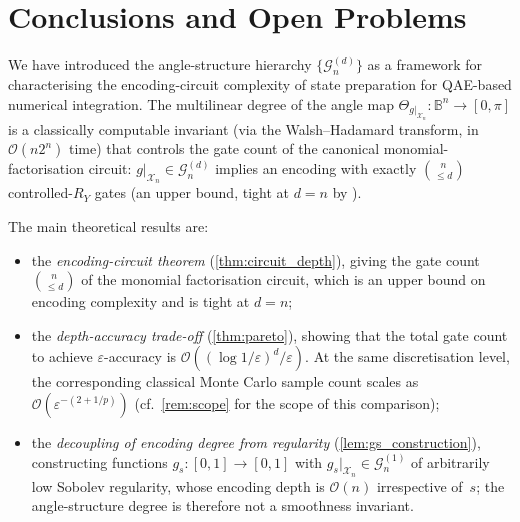 \documentclass[12pt,a4paper]{article}
\theoremstyle{plain}
\theoremstyle{definition}
\theoremstyle{remark}
\newcommand{\Ry}{R_Y}
\newcommand{\Gclass}[2]{\mathcal{G}_{#1}^{(#2)}}
\begin{document}
\section{Conclusions and Open Problems}
\label{sec:conclusions}

We have introduced the angle-structure hierarchy $\{\Gclass{n}{d}\}$ as
a framework for characterising the encoding-circuit complexity of state
preparation for QAE-based numerical integration.
The multilinear degree of the angle map $\Theta_{g|_{\mathcal{X}_n}}:\mathbb{B}^n\to[0,\pi]$
is a classically computable invariant (via the Walsh--Hadamard transform,
in $\mathcal{O}(n2^n)$ time) that controls the gate count of the
canonical monomial-factorisation circuit: $g|_{\mathcal{X}_n}\in\Gclass{n}{d}$
implies an encoding with exactly $\binom{n}{\leq d}$ controlled-$\Ry$
gates (an upper bound, tight at $d=n$ by \cite{ShendeBullockMarkov2006}).

The main theoretical results are:
\begin{itemize}
  \item the \emph{encoding-circuit theorem} (\cref{thm:circuit_depth}),
        giving the gate count $\binom{n}{\leq d}$ of the monomial
        factorisation circuit, which is an upper bound on encoding
        complexity and is tight at $d=n$;
  \item the \emph{depth-accuracy trade-off} (\cref{thm:pareto}),
        showing that the total gate count to achieve $\varepsilon$-accuracy
        is $\mathcal{O}((\log1/\varepsilon)^d/\varepsilon)$.  At the
        same discretisation level, the corresponding classical Monte
        Carlo sample count scales as
        $\mathcal{O}(\varepsilon^{-(2+1/p)})$
        (cf.\ \cref{rem:scope} for the scope of this comparison);
  \item the \emph{decoupling of encoding degree from regularity}
        (\cref{lem:gs_construction}), constructing functions
        $g_s:[0,1]\to[0,1]$ with
        $g_s|_{\mathcal{X}_n}\in\Gclass{n}{1}$ of arbitrarily low
        Sobolev regularity, whose encoding depth is $\mathcal{O}(n)$
        irrespective of~$s$; the angle-structure degree is therefore
        not a smoothness invariant.
\end{itemize}
\end{document}
